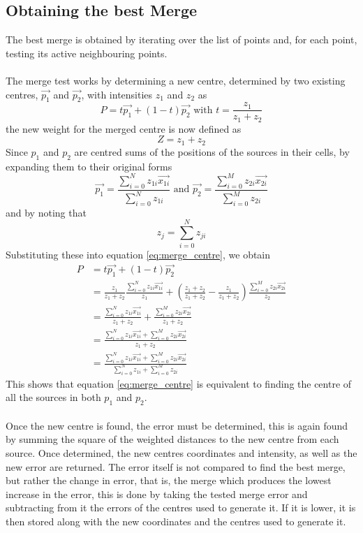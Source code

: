 \subsection{Obtaining the best Merge}
The best merge is obtained by iterating over the list of points and, for each point, testing its active neighbouring points.
\\
\\
The merge test works by determining a new centre, determined by two existing centres, $\vec{p_1}$ and $\vec{p_2}$, with intensities $z_1$ and $z_2$ as
\begin{equation} \label{eq:merge_centre}
	P = t\vec{p_1} + (1-t)\vec{p_2} \text{  with  } t = \frac{z_1}{z_1 + z_2}
\end{equation}
the new weight for the merged centre is now defined as
\begin{equation}
	Z = z_1 + z_2
\end{equation}
Since $p_1$ and $p_2$ are centred sums of the positions of the sources in their cells, by expanding them to their original forms
\begin{equation*}
\vec{p_1} = \frac{\sum^N_{i=0} z_{1i}\vec{x_{1i}}}{\sum^N_{i=0}z_{1i}} \text{  and  } \vec{p_2} = \frac{\sum^M_{i=0} z_{2i}\vec{x_{2i}}}{\sum^M_{i=0}z_{2i}}
\end{equation*}
and by noting that
\begin{equation*}
	z_j = \sum^N_{i=0}z_{ji}
\end{equation*}
Substituting these into equation \ref{eq:merge_centre}, we obtain
\begin{align*}
	P 	&= t\vec{p_1} + (1-t)\vec{p_2} \\
		&= \frac{z_1}{z_1 + z_2}\frac{\sum^N_{i=0} z_{1i}\vec{x_{1i}}}{z_1} + (\frac{z_1 + z_2}{z_1 + z_2} - \frac{z_1}{z_1 + z_2})\frac{\sum^M_{i=0} z_{2i}\vec{x_{2i}}}{z_2} \\
		&= \frac{\sum^N_{i=0} z_{1i}\vec{x_{1i}}}{z_1 + z_2} + \frac{\sum^M_{i=0} z_{2i}\vec{x_{2i}}}{z_1 + z_2} \\
		&= \frac{\sum^N_{i=0} z_{1i}\vec{x_{1i}} + \sum^M_{i=0} z_{2i}\vec{x_{2i}}}{z_1 + z_2} \\
		&= \frac{\sum^N_{i=0} z_{1i}\vec{x_{1i}} + \sum^M_{i=0} z_{2i}\vec{x_{2i}}}{\sum^N_{i=0}z_{1i} + \sum^M_{i=0}z_{2i}}
\end{align*}
This shows that equation \ref{eq:merge_centre} is equivalent to finding the centre of all the sources in both $p_1$ and $p_2$.
\\
\\
Once the new centre is found, the error must be determined, this is again found by summing the square of the weighted distances to the new centre from each source. Once determined, the new centres coordinates and intensity, as well as the new error are returned. The error itself is not compared to find the best merge, but rather the change in error, that is, the merge which produces the lowest increase in the error, this is done by taking the tested merge error and subtracting from it the errors of the centres used to generate it. If it is lower, it is then stored along with the new coordinates and the centres used to generate it.
